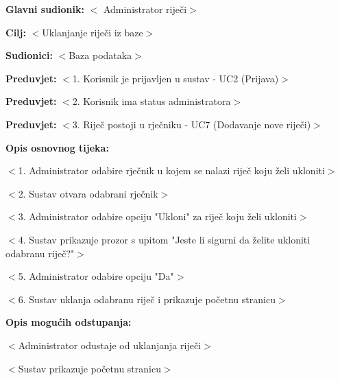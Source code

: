 					\noindent {}
				\begin{packed_item}
					
					\item \textbf{Glavni sudionik: }$<$ Administrator riječi$>$
					\item  \textbf{Cilj:} $<$Uklanjanje riječi iz baze$>$
					\item  \textbf{Sudionici:} $<$Baza podataka$>$
					\item  \textbf{Preduvjet:} $<$1. Korisnik je prijavljen u sustav - UC2 (Prijava)$>$
					\item  \textbf{Preduvjet:} $<$2. Korisnik ima status administratora$>$
					\item  \textbf{Preduvjet:} $<$3. Riječ postoji u rječniku - UC7 (Dodavanje nove riječi)$>$
					\item  \textbf{Opis osnovnog tijeka:}
					
					\item[] \begin{packed_enum}
						
						\item $<$1. Administrator odabire rječnik u kojem se nalazi riječ koju želi ukloniti$>$
						\item $<$2. Sustav otvara odabrani rječnik$>$
						\item $<$3. Administrator odabire opciju "Ukloni" za riječ koju želi ukloniti$>$
						\item $<$4. Sustav prikazuje prozor s upitom "Jeste li sigurni da želite ukloniti odabranu riječ?"$>$
						\item $<$5. Administrator odabire opciju "Da"$>$
						\item $<$6. Sustav uklanja odabranu riječ i prikazuje početnu stranicu$>$
					\end{packed_enum}
					
					\item  \textbf{Opis mogućih odstupanja:}
					
					\item[] \begin{packed_item}
						
						\item[5.a] $<$Administrator odustaje od uklanjanja riječi$>$
						\item[] \begin{packed_enum}
						
							\item $<$Sustav prikazuje početnu stranicu$>$
						
						\end{packed_enum}
						
					\end{packed_item}
				\end{packed_item}
				
